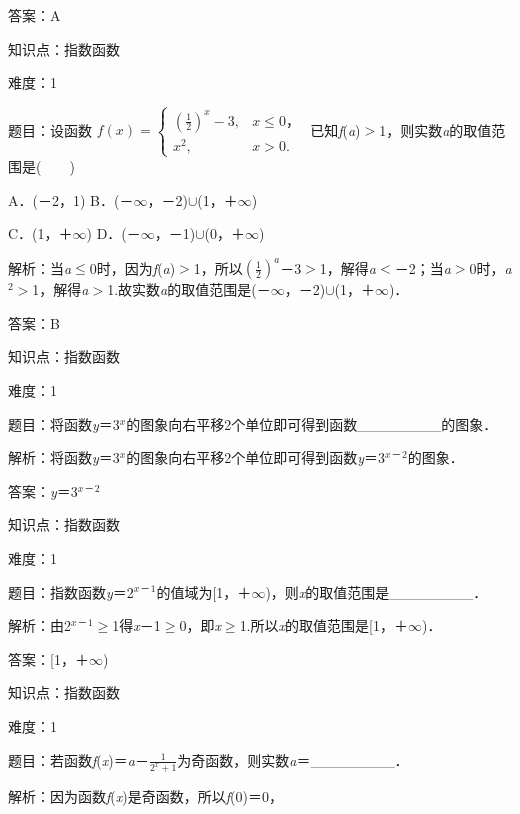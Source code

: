 \documentclass{article} %
\begin{document}
答案：A

知识点：指数函数

难度：1

题目：设函数
$ f(x)=\left\{
\begin{array}{ll}
(\frac{1}{2})^{x}-3,&x\leq 0，\\
x^{2},&x>0.
\end{array}
\right.
$
已知\textit{f}(\textit{a})$\mathrm{>}$1，则实数\textit{a}的取值范围是(　　)

A．(－2，1)   B．(－$\mathrm{\infty}$，－2)$\mathrm{\cup}$(1，＋$\mathrm{\infty}$)

C．(1，＋$\mathrm{\infty}$)   D．(－$\mathrm{\infty}$，－1)$\mathrm{\cup}$(0，＋$\mathrm{\infty}$)

解析：当\textit{a}$\mathrm{\le}$0时，因为\textit{f}(\textit{a})$\mathrm{>}$1，所以$(\frac{1}{2})^{a}$－3$\mathrm{>}$1，解得\textit{a}$\mathrm{<}$－2；当\textit{a}$\mathrm{>}$0时，\textit{a}${}^{2}$$\mathrm{>}$1，解得\textit{a}$\mathrm{>}$1.故实数\textit{a}的取值范围是(－$\mathrm{\infty}$，－2)$\mathrm{\cup}$(1，＋$\mathrm{\infty}$)．

答案：B

知识点：指数函数

难度：1

题目：将函数\textit{y}＝3\textit{${}^{x}$}的图象向右平移2个单位即可得到函数\_\_\_\_\_\_\_\_的图象．

解析：将函数\textit{y}＝3\textit{${}^{x}$}的图象向右平移2个单位即可得到函数\textit{y}＝3\textit{${}^{x}$}${}^{\textrm{－}}$${}^{2}$的图象．

答案：\textit{y}＝3\textit{${}^{x}$}${}^{\textrm{－}}$${}^{2}$

知识点：指数函数

难度：1

题目：指数函数\textit{y}＝2\textit{${}^{x}$}${}^{\textrm{－}}$${}^{1}$的值域为[1，＋$\mathrm{\infty}$)，则\textit{x}的取值范围是\_\_\_\_\_\_\_\_．

解析：由2\textit{${}^{x}$}${}^{\textrm{－}}$${}^{1}$$\mathrm{\ge}$1得\textit{x}－1$\mathrm{\ge}$0，即\textit{x}$\mathrm{\ge}$1.所以\textit{x}的取值范围是[1，＋$\mathrm{\infty}$)．

答案：[1，＋$\mathrm{\infty}$)

知识点：指数函数

难度：1

题目：若函数\textit{f}(\textit{x})＝\textit{a}－$\frac{1}{2^{x}+1}$为奇函数，则实数\textit{a}＝\_\_\_\_\_\_\_\_．

解析：因为函数\textit{f}(\textit{x})是奇函数，所以\textit{f}(0)＝0，
\end{document}
